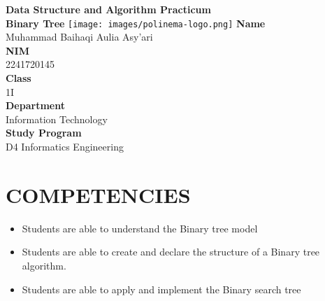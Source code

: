 \documentclass[12pt,titlepage]{article}
\newcommand{\vSubject}{Data Structure and Algorithm Practicum}
\newcommand{\vSubtitle}{Binary Tree}
\newcommand{\vName}{Muhammad Baihaqi Aulia Asy'ari}
\newcommand{\vNIM}{2241720145}
\newcommand{\vClass}{1I}
\newcommand{\vDepartment}{Information Technology}
\newcommand{\vStudyProgram}{D4 Informatics Engineering}
\begin{document}
\begin{titlepage}
    \centering
    \vfill
    {\bfseries\LARGE
        \vSubject\\
        \vskip0.25cm
        \vSubtitle
    }
    \vfill
    \texttt{[image: images/polinema-logo.png]}
    \vfill
    {
        \textbf{Name}\\
        \vName\\
        \vskip0.5cm
        \textbf{NIM}\\
        \vNIM\\
        \vskip0.5cm
        \textbf{Class}\\
        \vClass\\
        \vskip0.5cm
        \textbf{Department}\\
        \vDepartment\\
        \vskip0.5cm
        \textbf{Study Program}\\
        \vStudyProgram
    }
\end{titlepage}

\newpage

\section{COMPETENCIES}
\begin{itemize}
    \item Students are able to understand the Binary tree model
    \item Students are able to create and declare the structure of a Binary tree algorithm.
    \item Students are able to apply and implement the Binary search tree
\end{itemize}
\end{document}
